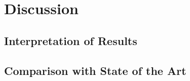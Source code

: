 \chapter{Discussion}

\section{Interpretation of Results}


\section{Comparison with State of the Art}

